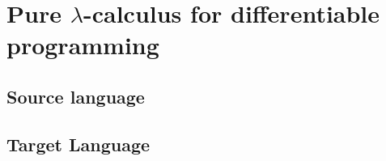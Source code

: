 \section{Pure $\lambda$-calculus for differentiable programming} %
\label{sec:pure_lambda_calculus_for_differentiable_programming}

\subsection{Source language} %
\label{sub:source_language}

\subsection{Target Language} %
\label{sub:target_language}


